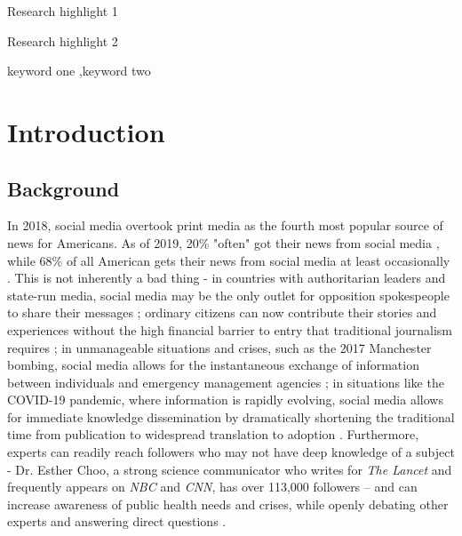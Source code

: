 \documentclass[preprint,review,12pt]{elsarticle}
\begin{document}
\begin{frontmatter}

\begin{highlights}
\item Research highlight 1
\item Research highlight 2
\end{highlights}

\begin{keyword}
keyword one \sep keyword two
\end{keyword}

\end{frontmatter}

\tableofcontents

\section{Introduction}
\label{introduction}
\subsection{Background}
 In 2018, social media overtook print media as the fourth most popular source of news for Americans. As of 2019, 20\% "often" got their news from social media \cite{shearer2018social}, while 68\% of all American gets their news from social media at least occasionally \cite{matsa2018news}. This is not inherently a bad thing - in countries with authoritarian leaders and state-run media, social media may be the only outlet for opposition spokespeople to share their messages \cite{walker2014breaking}; ordinary citizens can now contribute their stories and experiences without the high financial barrier to entry that traditional journalism requires \cite{qualman2012socialnomics, tapscott2008wikinomics}; in unmanageable situations and crises, such as the 2017 Manchester bombing, social media allows for the instantaneous exchange of information between individuals and emergency management agencies \cite{mirbabaie2020breaking, eriksson2016facebook}; in situations like the COVID-19 pandemic, where information is rapidly evolving, social media allows for immediate knowledge dissemination by dramatically shortening the traditional time from publication to widespread translation to adoption \cite{chan2020social}. Furthermore, experts can readily reach followers who may not have deep knowledge of a subject - Dr. Esther Choo, a strong science communicator who writes for \textit{The Lancet} and frequently appears on \textit{NBC} and \textit{CNN}, has over 113,000 followers – and can increase awareness of public health needs and crises, while openly debating other experts and answering direct questions \cite{gottlieb2020information}.
\end{document}
